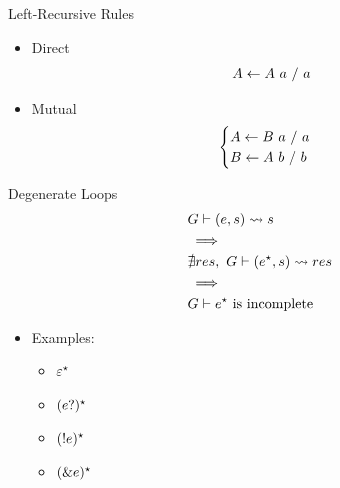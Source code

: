 \documentclass{beamer}
\begin{document}

\begin{frame}{Left-Recursive Rules}
    \begin{itemize}
        \item Direct
        \begin{align*}
            A \leftarrow A\ a\ /\ a
        \end{align*}
        \item Mutual
        \begin{align*}
            \begin{cases}
               A \leftarrow B\ a\ /\ a \\
               B \leftarrow A\ b\ /\ b
            \end{cases}
        \end{align*}
    \end{itemize}
\end{frame}

\begin{frame}{Degenerate Loops}
    \begin{align*}
        & G \vdash (e, s) \rightsquigarrow s \\
        & \implies \\
        & \nexists res,\ G \vdash (e^\star, s) \rightsquigarrow res \\
        & \implies \\
        & \text{$G \vdash e^\star$ is incomplete}
    \end{align*}
    \begin{itemize}
        \item Examples:
        \begin{itemize}
            \item $\varepsilon^\star$
            \item $(e?)^\star$
            \item $(!e)^\star$
            \item $(\&e)^\star$
        \end{itemize}
    \end{itemize}
\end{frame}
\end{document}

